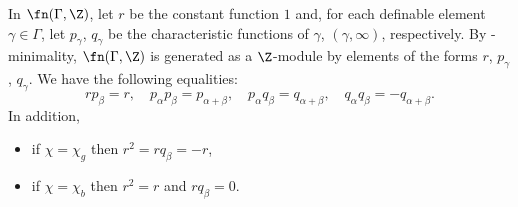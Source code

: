 \begin{nota}\label{gam:equ:cons}
In $\fn(\Gamma, \Z)$, let $r$ be the constant function $1$ and, for each definable element $\gamma \in \Gamma$, let $p_{\gamma}$,  $q_{\gamma}$ be the characteristic functions of $\gamma$, $(\gamma, \infty)$, respectively. By \omin-minimality, $\fn(\Gamma, \Z)$ is generated as a $\Z$-module by elements of the forms $r$, $p_\gamma$, $q_\gamma$. We have the following equalities:
\[
r p_\beta   = r, \quad p_\alpha p_\beta = p_{\alpha+ \beta}, \quad p_\alpha q_\beta  = q_{\alpha+ \beta}, \quad q_\alpha q_\beta = - q_{\alpha+ \beta}.
\]
In addition,
\begin{itemize}
  \item if $\chi = \chi_{g}$ then $r^2 = r q_\beta = - r$,
  \item if $\chi = \chi_{b}$ then $r^2 = r$ and $r q_\beta = 0$.
\end{itemize}
\end{nota}

